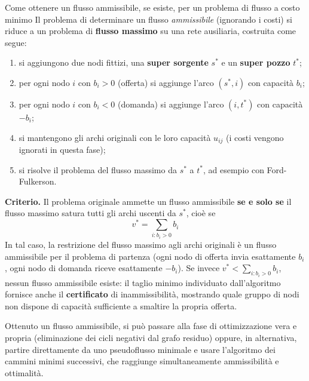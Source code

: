 \documentclass[12pt]{extarticle} %
\begin{document}
\begin{teoriabox}{Come ottenere un flusso ammissibile, se esiste, per un problema di flusso a costo minimo}
Il problema di determinare un flusso \textit{ammissibile} (ignorando i costi) si riduce a un problema di \textbf{flusso massimo} su una rete ausiliaria, costruita come segue:
\begin{enumerate}
    \item si aggiungono due nodi fittizi, una \textbf{super sorgente} $s^*$ e un \textbf{super pozzo} $t^*$;
    \item per ogni nodo $i$ con $b_i > 0$ (offerta) si aggiunge l'arco $(s^*, i)$ con capacità $b_i$;
    \item per ogni nodo $i$ con $b_i < 0$ (domanda) si aggiunge l'arco $(i, t^*)$ con capacità $-b_i$;
    \item si mantengono gli archi originali con le loro capacità $u_{ij}$ (i costi vengono ignorati in questa fase);
    \item si risolve il problema del flusso massimo da $s^*$ a $t^*$, ad esempio con Ford-Fulkerson.
\end{enumerate}

\noindent\textbf{Criterio.} Il problema originale ammette un flusso ammissibile \textbf{se e solo se} il flusso massimo satura tutti gli archi uscenti da $s^*$, cioè se
\[
v^* = \sum_{i : b_i > 0} b_i
\]
In tal caso, la restrizione del flusso massimo agli archi originali è un flusso ammissibile per il problema di partenza (ogni nodo di offerta invia esattamente $b_i$, ogni nodo di domanda riceve esattamente $-b_i$). Se invece $v^* < \sum_{i: b_i>0} b_i$, nessun flusso ammissibile esiste: il taglio minimo individuato dall'algoritmo fornisce anche il \textbf{certificato} di inammissibilità, mostrando quale gruppo di nodi non dispone di capacità sufficiente a smaltire la propria offerta.

\noindent Ottenuto un flusso ammissibile, si può passare alla fase di ottimizzazione vera e propria (eliminazione dei cicli negativi dal grafo residuo) oppure, in alternativa, partire direttamente da uno pseudoflusso minimale e usare l'algoritmo dei cammini minimi successivi, che raggiunge simultaneamente ammissibilità e ottimalità.
\end{teoriabox}
\end{document}
